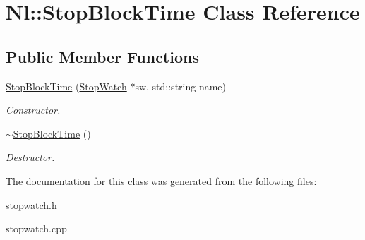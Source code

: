 \hypertarget{classNl_1_1StopBlockTime}{\section{Nl\-:\-:Stop\-Block\-Time Class Reference}
\label{classNl_1_1StopBlockTime}
}
\subsection*{Public Member Functions}
\begin{DoxyCompactItemize}
\item 
\hyperlink{group__Tools_ga33325d365bbddda3814093ca7e362474}{Stop\-Block\-Time} (\hyperlink{classNl_1_1StopWatch}{Stop\-Watch} $\ast$sw, std\-::string name)
\begin{DoxyCompactList}\small\item\em Constructor. \end{DoxyCompactList}\item 
\hyperlink{group__Tools_ga6b16ead71407ac4cc14b293e46bfbc3a}{$\sim$\-Stop\-Block\-Time} ()
\begin{DoxyCompactList}\small\item\em Destructor. \end{DoxyCompactList}\end{DoxyCompactItemize}


The documentation for this class was generated from the following files\-:\begin{DoxyCompactItemize}
\item 
stopwatch.\-h\item 
stopwatch.\-cpp\end{DoxyCompactItemize}
